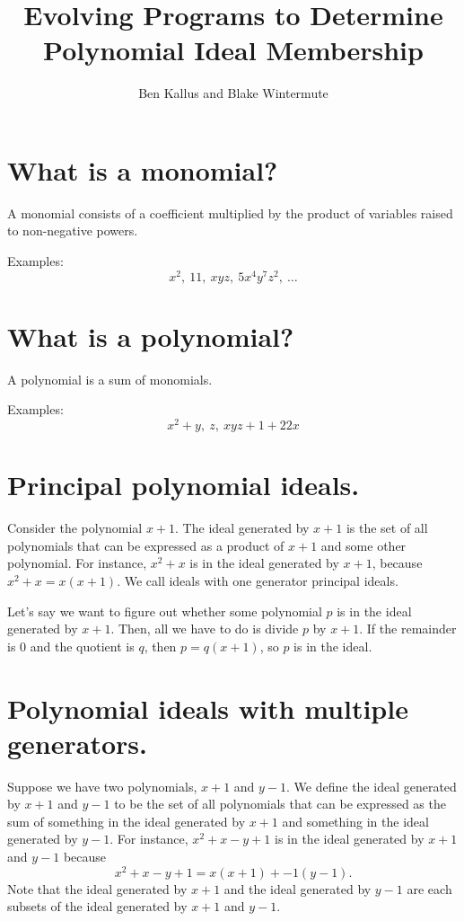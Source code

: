 \documentclass[20pt]{extarticle}
\title{Evolving Programs to Determine Polynomial Ideal Membership}
\author{Ben Kallus and Blake Wintermute}
\date{ }
\begin{document}
\pagecolor{black}
\color{white}
\maketitle

\newpage
\section*{What is a monomial?}

    A monomial consists of a coefficient multiplied by the product of variables raised to non-negative powers.

    Examples: $$x^2,~ 11,~ xyz,~ 5x^4y^7z^2,~ \hdots$$

\newpage
\section*{What is a polynomial?}

    A polynomial is a sum of monomials.

    Examples: $$x^2 + y,~ z,~ xyz + 1 + 22x$$

\newpage
\section*{Principal polynomial ideals.}

    Consider the polynomial $x+1$.
    The ideal generated by $x+1$ is the set of all polynomials that can be expressed as a product of $x+1$ and some other polynomial.
    For instance, $x^2+x$ is in the ideal generated by $x+1$, because $x^2 + x = x(x+1)$.
    We call ideals with one generator principal ideals.

    Let's say we want to figure out whether some polynomial $p$ is in the ideal generated by $x+1$.
    Then, all we have to do is divide $p$ by $x+1$.
    If the remainder is 0 and the quotient is $q$, then $p = q(x+1)$, so $p$ is in the ideal.

\newpage
\section*{Polynomial ideals with multiple generators.}
    Suppose we have two polynomials, $x+1$ and $y-1$.
    We define the ideal generated by $x+1$ and $y-1$ to be the set of all polynomials that can be expressed as the sum of something in the ideal generated by $x+1$ and something in the ideal generated by $y-1$.
    For instance, $x^2+x-y+1$ is in the ideal generated by $x+1$ and $y-1$ because $$x^2+x-y+1 = x(x+1) + -1(y-1).$$
    Note that the ideal generated by $x+1$ and the ideal generated by $y-1$ are each subsets of the ideal generated by $x+1$ and $y-1$.
\end{document}
